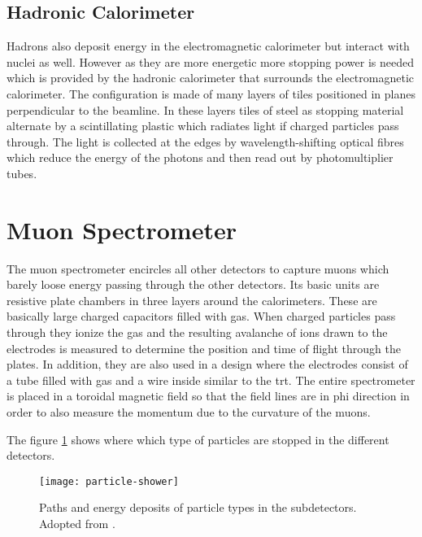 \subsection*{Hadronic Calorimeter}

Hadrons also deposit energy in the electromagnetic calorimeter but interact with nuclei as well. However as they are more energetic more stopping power is needed which is provided by the hadronic calorimeter that surrounds the electromagnetic calorimeter. The configuration is made of many layers of tiles positioned in planes perpendicular to the beamline. In these layers tiles of steel as stopping material alternate by a scintillating plastic which radiates light if charged particles pass through. The light is collected at the edges by wavelength-shifting optical fibres  which reduce the energy of the photons and then read out by photomultiplier tubes.

\section{Muon Spectrometer}

The muon spectrometer encircles all other detectors to capture muons which barely loose energy passing through the other detectors. Its basic units are resistive plate chambers in three layers around the calorimeters. These are basically large charged capacitors filled with gas. When charged particles pass through they ionize the gas and the resulting avalanche of ions drawn to the electrodes is measured to determine the position and time of flight through the plates.  In addition, they are also used in a design where the electrodes consist of a tube filled with gas and a wire inside similar to the \ac{trt}. The entire spectrometer is placed in a toroidal magnetic field so that the field lines are in phi direction in order to also measure the momentum due to the curvature of the muons.

The figure \ref{fig:particles_in_detector} shows where which type of particles are stopped in the different detectors.
\begin{figure}
    \centering
    \texttt{[image: particle-shower]}
    \caption[]{Paths and energy deposits of particle types in the subdetectors. Adopted from \citep{Guth:2765038}.}
    \label{fig:particles_in_detector}
\end{figure}

